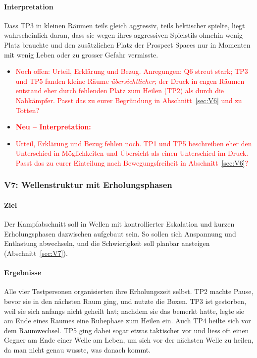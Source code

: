 \documentclass[../Main.tex]{subfiles}
\begin{document}
\paragraph{Interpretation}
Dass TP3 in kleinen Räumen teils gleich aggressiv, teils hektischer spielte, liegt wahrscheinlich daran, dass sie wegen ihres aggressiven Spielstils ohnehin wenig Platz brauchte und den zusätzlichen Platz der Prospect Spaces nur in Momenten mit wenig Leben oder zu grosser Gefahr vermisste.

\begin{itemize}[leftmargin=1.5cm]
    \item \textcolor{red}{Noch offen: Urteil, Erklärung und Bezug. Anregungen: Q6 streut stark; TP3 und TP5 fanden kleine Räume \emph{übersichtlicher}; der Druck in engen Räumen entstand eher durch fehlenden Platz zum Heilen (TP2) als durch die Nahkämpfer. Passt das zu eurer Begründung in Abschnitt~\ref{sec:V6} und zu Totten?}
\end{itemize}

\begin{itemize}[leftmargin=1.5cm]
    \item \textcolor{red}{\textbf{Neu -- Interpretation:}}
    \item \textcolor{red}{Urteil, Erklärung und Bezug fehlen noch. TP1 und TP5 beschreiben eher den Unterschied in Möglichkeiten und Übersicht als einen Unterschied im Druck. Passt das zu eurer Einteilung nach Bewegungsfreiheit in Abschnitt~\ref{sec:V6}?}
\end{itemize}

\subsubsection{V7: Wellenstruktur mit Erholungsphasen}

\paragraph{Ziel}
Der Kampfabschnitt soll in Wellen mit kontrollierter Eskalation und kurzen Erholungsphasen dazwischen aufgebaut sein. So sollen sich Anspannung und Entlastung abwechseln, und die Schwierigkeit soll planbar ansteigen (Abschnitt~\ref{sec:V7}).

\paragraph{Ergebnisse}
Alle vier Testpersonen organisierten ihre Erholungszeit selbst. TP2 machte Pause, bevor sie in den nächsten Raum ging, und nutzte die Boxen. TP3 ist gestorben, weil sie sich anfangs nicht geheilt hat; nachdem sie das bemerkt hatte, legte sie am Ende eines Raumes eine Ruhephase zum Heilen ein. Auch TP4 heilte sich vor dem Raumwechsel. TP5 ging dabei sogar etwas taktischer vor und liess oft einen Gegner am Ende einer Welle am Leben, um sich vor der nächsten Welle zu heilen, da man nicht genau wusste, was danach kommt.
\end{document}
